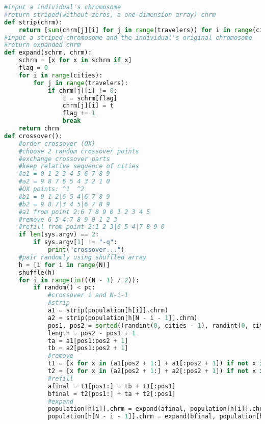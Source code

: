\documentclass[UTF8,cs4size]{ctexart}
\begin{document}
\begin{lstlisting}[language=Python]
#input a individual's chromosome
#return striped(without zeros, a one-dimension array) chrm
def strip(chrm):
    return [sum(chrm[j][i] for j in range(travelers)) for i in range(cities)]
#input a striped chromosome and the individual's original chromosome
#return expanded chrm
def expand(schrm, chrm):
    schrm = [x for x in schrm if x]
    flag = 0
    for i in range(cities):
        for j in range(travelers):
            if chrm[j][i] != 0:
                t = schrm[flag]
                chrm[j][i] = t
                flag += 1
                break
    return chrm
def crossover():
    #order crossover (OX)
    #choose 2 random crossover points
    #exchange crossover parts
    #keep relative sequence of cities
    #a1 = 0 1 2 3 4 5 6 7 8 9
    #a2 = 9 8 7 6 5 4 3 2 1 0
    #OX points: ^1  ^2
    #b1 = 0 1 2|6 5 4|6 7 8 9
    #b2 = 9 8 7|3 4 5|6 7 8 9
    #a1 from point 2:6 7 8 9 0 1 2 3 4 5
    #remove 6 5 4:7 8 9 0 1 2 3
    #refill from point 2:1 2 3|6 5 4|7 8 9 0
    if len(sys.argv) == 2:
        if sys.argv[1] != "-q":
            print("crossover...")
    #pair randomly using shuffled array
    h = [i for i in range(N)]
    shuffle(h)
    for i in range(int((N - 1) / 2)):
        if random() < pc:
            #crossover i and N-i-1
            #strip
            a1 = strip(population[h[i]].chrm)
            a2 = strip(population[h[N - i - 1]].chrm)
            pos1, pos2 = sorted((randint(0, cities - 1), randint(0, cities - 1)))
            length = pos2 - pos1 + 1
            ta = a1[pos1:pos2 + 1]
            tb = a2[pos1:pos2 + 1]
            #remove
            t1 = [x for x in (a1[pos2 + 1:] + a1[:pos2 + 1]) if not x in tb]
            t2 = [x for x in (a2[pos2 + 1:] + a2[:pos2 + 1]) if not x in ta]
            #refill
            afinal = t1[pos1:] + tb + t1[:pos1]
            bfinal = t2[pos1:] + ta + t2[:pos1]
            #expand
            population[h[i]].chrm = expand(afinal, population[h[i]].chrm)
            population[h[N - i - 1]].chrm = expand(bfinal, population[h[N - i - 1]].chrm)


\end{lstlisting}
\end{document}
